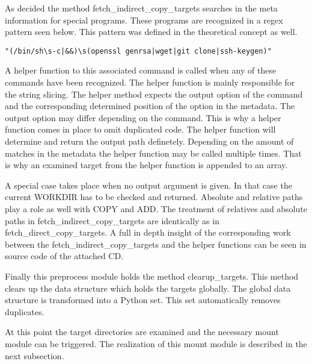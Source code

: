 As decided the method fetch\_indirect\_copy\_targets searches in the meta information for special programs. 
These programs are recognized in a regex pattern seen below. 
This pattern was defined in the theoretical concept as well.
\begin{lstlisting}
"(/bin/sh\s-c|&&)\s(openssl genrsa|wget|git clone|ssh-keygen)"
\end{lstlisting}
A helper function to this associated command is called when any of these commands have been recognized. 
The helper function is mainly responsible for the string slicing.
The helper method expects the output option of the command and the corresponding determined position of the option in the metadata.
The output option may differ depending on the command. 
This is why a helper function comes in place to omit duplicated code. 
The helper function will determine and return the output path definetely.
Depending on the amount of matches in the metadata the helper function may be called multiple times. 
That is why an examined target from the helper function is appended to an array. 

A special case takes place when no output argument is given. 
In that case the current WORKDIR has to be checked and returned.
Absolute and relative paths play a role as well with COPY and ADD. 
The treatment of relatives and absolute paths in fetch\_indirect\_copy\_targets are identically as in fetch\_direct\_copy\_targets.
A full in depth insight of the corresponding work between the fetch\_indirect\_copy\_targets and the helper functions can be seen in source code of the attached CD.

Finally this preprocess module holds the method clearup\_targets. This method clears up the data structure which holds the targets globally. The global data structure is transformed into a Python set. This set automatically removes duplicates.
	
At this point the target directories are examined and the necessary mount module can be triggered. The realization of this mount module is described in the next subsection.


